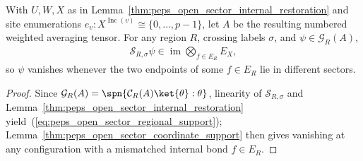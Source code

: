 \begin{lemma}%
    \label{thm:peps_open_sector_regional_support}
    \leanok
    With $U,W,X$ as in Lemma~\ref{thm:peps_open_sector_internal_restoration}
    and site enumerations $e_v:X^{\operatorname{Inc}(v)}\cong\{0,\ldots,p-1\}$,
    let $A$ be the resulting numbered weighted averaging tensor. For any region
    $R$, crossing labels $\sigma$, and $\psi\in\mathcal G_R(A)$,
    \begin{align}
        \mathcal S_{R,\sigma}\psi
        \in\operatorname{im}\bigotimes_{f\in E_R}E_X,
        \label{eq:peps_open_sector_regional_support}
    \end{align}
    so $\psi$ vanishes whenever the two endpoints of some $f\in E_R$ lie in
    different sectors.
\end{lemma}
\begin{proof}\leanok
    Since $\mathcal G_R(A)=\spn\{\mathcal C_R(A)\ket{\theta}:\theta\}$,
    linearity of $\mathcal S_{R,\sigma}$ and
    Lemma~\ref{thm:peps_open_sector_internal_restoration} yield~(\ref{eq:peps_open_sector_regional_support});
    Lemma~\ref{thm:peps_open_sector_coordinate_support} then gives vanishing
    at any configuration with a mismatched internal bond $f\in E_R$.
\end{proof}

